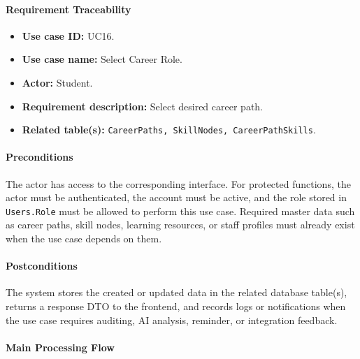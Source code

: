 \paragraph{Requirement Traceability}

\begin{itemize}
    \item \textbf{Use case ID:} UC16.
    \item \textbf{Use case name:} Select Career Role.
    \item \textbf{Actor:} Student.
    \item \textbf{Requirement description:} Select desired career path.
    \item \textbf{Related table(s):} \texttt{CareerPaths, SkillNodes, CareerPathSkills}.
\end{itemize}

\paragraph{Preconditions}

The actor has access to the corresponding interface. For protected functions, the actor must be authenticated, the account must be active, and the role stored in \texttt{Users.Role} must be allowed to perform this use case. Required master data such as career paths, skill nodes, learning resources, or staff profiles must already exist when the use case depends on them.

\paragraph{Postconditions}

The system stores the created or updated data in the related database table(s), returns a response DTO to the frontend, and records logs or notifications when the use case requires auditing, AI analysis, reminder, or integration feedback.

\paragraph{Main Processing Flow}

